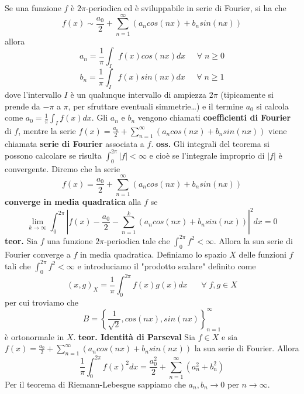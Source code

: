 Se una funzione $f$ è $2\pi$-periodica ed è sviluppabile in serie di Fourier, si ha che
\[
    f(x) \sim  \frac{a_0}{2} + \sum_{n=1}^{\infty}(a_n cos(nx) + b_n sin(nx))
\]
allora
\[
    a_n = \frac{1}{\pi} \int_{I} f(x) cos(nx) dx \;\;\;\; \;\forall\;n\geq0
\]
\[
    b_n = \frac{1}{\pi} \int_{I} f(x) sin(nx) dx \;\;\;\;\;\forall\;n\geq 1
\]
dove l'intervallo $I$ è un qualunque intervallo di ampiezza $2\pi$ (tipicamente si prende da $-\pi$ a $\pi$, per sfruttare eventuali simmetrie\dots) e il termine $a_0$ si calcola come $a_0 = \frac{1}{\pi} \int_{I} f(x) dx$.\newline
Gli $a_n$ e $b_n$ vengono chiamati \textbf{coefficienti di Fourier} di $f$, mentre la serie $f(x) = \frac{a_0}{2} + \sum_{n=1}^{\infty}(a_n cos(nx) + b_n sin(nx))$ viene chiamata \textbf{serie di Fourier} associata a $f$.\newline
\newline
\textbf{oss.} Gli integrali del teorema si possono calcolare se risulta $\int_{0}^{2\pi}|f| < \infty$ e cioè se l'integrale improprio di $|f|$ è convergente.\newline
\newline
Diremo che la serie 
\[
    f(x) = \frac{a_0}{2} + \sum_{n=1}^{\infty}(a_n cos(nx) + b_n sin(nx))
\]
\textbf{converge in media quadratica} alla $f$ se
\[
    \lim_{k\rightarrow \infty} \int_{0}^{2\pi} \left| f(x) - \frac{a_0}{2} - \sum_{n=1}^{k}\left( a_n cos(nx) + b_n sin(nx) \right) \right|^2 dx = 0
\]
\newline
\textbf{teor.} Sia $f$ una funzione $2\pi$-periodica tale che $\int_{0}^{2\pi}f^2 < \infty$. Allora la sua serie di Fourier converge a $f$ in media quadratica.\newline
\newline
Definiamo lo spazio $X$ delle funzioni $f$ tali che $\int_{0}^{2\pi}f^2 < \infty$ e introduciamo il "prodotto scalare" definito come
\[
    (x,g)_{X} = \frac{1}{\pi}\int_{0}^{2\pi} f(x) g(x) dx \;\;\;\;\; \;\forall\;f,g \in X
\]
per cui troviamo che 
\[
    B = \left\{ \frac{1}{\sqrt{2}}, cos(nx), sin(nx) \right\}_{n=1} ^\infty
\]
è ortonormale in $X$.\newline
\newline
\textbf{teor. Identità di Parseval}\newline
Sia $f \in X$ e sia $f(x) = \frac{a_0}{2} + \sum_{n=1}^{\infty}(a_n cos(nx) + b_n sin(nx))$ la sua serie di Fourier. Allora
\[
    \frac{1}{\pi} \int_{0}^{2\pi} f(x)^2 dx = \frac{a_0^2}{2} + \sum_{n=1}^{\infty}(a_n^2 + b_n^2)
\]
Per il teorema di Riemann-Lebesgue sappiamo che $a_n, b_n \rightarrow  0$ per $n \rightarrow  \infty$.\newline

